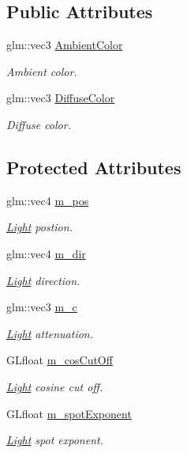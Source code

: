 \subsection*{Public Attributes}
\begin{DoxyCompactItemize}
\item 
glm\+::vec3 \hyperlink{class_light_a3ddf6a283f42e3e3ce6a403b9477f7c2}{Ambient\+Color}
\begin{DoxyCompactList}\small\item\em Ambient color. \end{DoxyCompactList}\item 
glm\+::vec3 \hyperlink{class_light_ab3885005f09ec9411cc1f31c069dc7d9}{Diffuse\+Color}
\begin{DoxyCompactList}\small\item\em Diffuse color. \end{DoxyCompactList}\end{DoxyCompactItemize}
\subsection*{Protected Attributes}
\begin{DoxyCompactItemize}
\item 
glm\+::vec4 \hyperlink{class_light_a108cbac703d7fc2bc6eb39185d9bead9}{m\+\_\+pos}
\begin{DoxyCompactList}\small\item\em \hyperlink{class_light}{Light} postion. \end{DoxyCompactList}\item 
glm\+::vec4 \hyperlink{class_light_a837f0e73f495fd9361b6eecaafaef275}{m\+\_\+dir}
\begin{DoxyCompactList}\small\item\em \hyperlink{class_light}{Light} direction. \end{DoxyCompactList}\item 
glm\+::vec3 \hyperlink{class_light_a31a4d7e3042d7ffe99e3070bcaa6aa61}{m\+\_\+c}
\begin{DoxyCompactList}\small\item\em \hyperlink{class_light}{Light} attenuation. \end{DoxyCompactList}\item 
G\+Lfloat \hyperlink{class_light_a5f99e10dc1c5c49785c4523d09588eef}{m\+\_\+cos\+Cut\+Off}
\begin{DoxyCompactList}\small\item\em \hyperlink{class_light}{Light} cosine cut off. \end{DoxyCompactList}\item 
G\+Lfloat \hyperlink{class_light_a262000d67538f1a25613e18fe17668cd}{m\+\_\+spot\+Exponent}
\begin{DoxyCompactList}\small\item\em \hyperlink{class_light}{Light} spot exponent. \end{DoxyCompactList}\end{DoxyCompactItemize}



